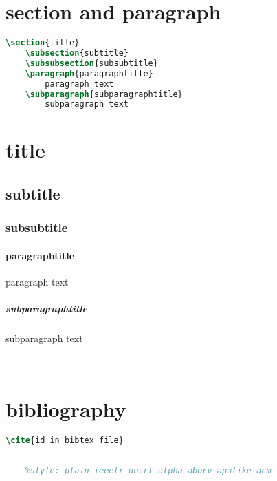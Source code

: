 \documentclass[11pt,a4paper]{article}
\begin{document}
\section{section and paragraph}
\begin{minipage}[c]{0.52\textwidth}
\begin{lstlisting}[language = TeX]
	\section{title}
	\subsection{subtitle}
	\subsubsection{subsubtitle}
	\paragraph{paragraphtitle} 
		paragraph text	
	\subparagraph{subparagraphtitle} 
		subparagraph text	
\end{lstlisting}
\end{minipage}
\hfill
\begin{minipage}[c]{0.4\textwidth}
	\section*{title}
	\subsection*{subtitle}
	\subsubsection*{subsubtitle}
	\paragraph{paragraphtitle} paragraph text	
	\subparagraph{subparagraphtitle} subparagraph text
\end{minipage}
\\[1em]
\section{bibliography}
\begin{lstlisting}[language = TeX]
	\cite{id in bibtex file}
	
	
	%style: plain ieeetr unsrt alpha abbrv apalike acm 
	
\end{lstlisting}
\end{document}
